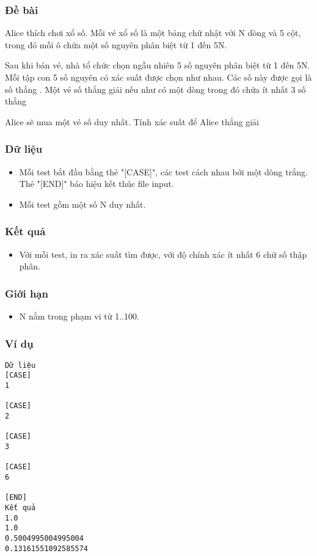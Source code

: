 



\subsubsection{   Đề bài  }

   Alice thích chơi xổ số. Mỗi vé xổ số là một bảng chữ nhật với N dòng và 5 cột, trong đó mỗi ô chứa một số nguyên phân biệt từ 1 đến 5N.  

   Sau khi bán vé, nhà tổ chức chọn ngẫu nhiên 5 số nguyên phân biệt từ 1 đến 5N. Mỗi tập con 5 số nguyên có xác suất được chọn như nhau. Các số này được gọi là   số thắng   . Một vé số thắng giải nếu như có một dòng trong đó chứa ít nhất 3   số thắng

   Alice sẽ mua một vé số duy nhất. Tính xác suất để Alice thắng giải  

\subsubsection{   Dữ liệu  }
\begin{itemize}
	\item     Mỗi test bắt đầu bằng thẻ "[CASE]", các test cách nhau bởi một dòng trắng. Thẻ "[END]" báo hiệu kết thúc file input.   
	\item     Mỗi test gồm một số N duy nhất.   
\end{itemize}

\subsubsection{   Kết quả  }
\begin{itemize}
	\item     Với mỗi test, in ra xác suất tìm được, với độ chính xác ít nhất 6 chữ số thập phân.   
\end{itemize}

\subsubsection{   Giới hạn  }
\begin{itemize}
	\item     N nằm trong phạm vi từ 1..100.   
\end{itemize}

\subsubsection{   Ví dụ  }
\begin{verbatim}
Dữ liệu
[CASE]
1

[CASE]
2

[CASE]
3

[CASE]
6

[END]
Kết quả
1.0
1.0
0.5004995004995004
0.13161551092585574
\end{verbatim}
